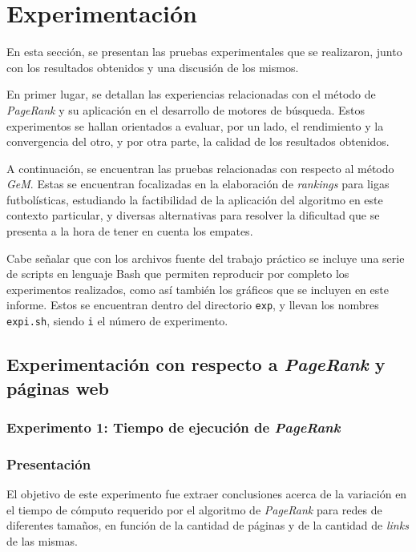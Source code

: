 \section{Experimentación}

    En esta sección, se presentan las pruebas experimentales que se realizaron, junto con los resultados obtenidos y una discusión de los mismos.

    En primer lugar, se detallan las experiencias relacionadas con el método de \emph{PageRank} y su aplicación en el desarrollo de motores de búsqueda. Estos experimentos se hallan orientados a evaluar, por un lado, el rendimiento y la convergencia del otro, y por otra parte, la calidad de los resultados obtenidos.

    A continuación, se encuentran las pruebas relacionadas con respecto al método \emph{GeM}. Estas se encuentran focalizadas en la elaboración de \emph{rankings} para ligas futbolísticas, estudiando la factibilidad de la aplicación del algoritmo en este contexto particular, y diversas alternativas para resolver la dificultad que se presenta a la hora de tener en cuenta los empates.

    Cabe señalar que con los archivos fuente del trabajo práctico se incluye una serie de scripts en lenguaje Bash que permiten reproducir por completo los experimentos realizados, como así también los gráficos que se incluyen en este informe. Estos se encuentran dentro del directorio \texttt{exp}, y llevan los nombres \texttt{exp{i}.sh}, siendo \texttt{i} el número de experimento.

    \subsection{Experimentación con respecto a \emph{PageRank} y páginas web}

        \subsubsection{Experimento 1: Tiempo de ejecución de \emph{PageRank}}

            \subsubsection*{Presentación}
                El objetivo de este experimento fue extraer conclusiones acerca de la variación en el tiempo de cómputo requerido por el algoritmo de \emph{PageRank} para redes de diferentes tamaños, en función de la cantidad de páginas y de la cantidad de \emph{links} de las mismas.

